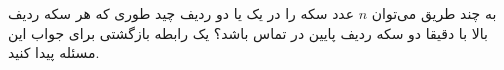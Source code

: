     \p 
به چند طریق می‌توان
$n$
عدد سکه را در یک یا دو ردیف چید طوری که هر سکه ردیف بالا با دقیقا دو سکه ردیف پایین در تماس باشد؟ یک رابطه بازگشتی برای جواب این مسئله پیدا کنید.